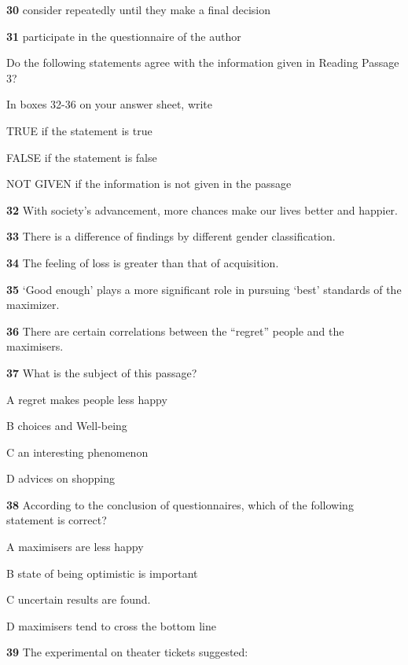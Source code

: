 \documentclass{../templateReading/cdreading}
\begin{document}
\textbf{30} consider repeatedly until they make a final decision

\textbf{31} participate in the questionnaire of the author


Do the following statements agree with the information given in Reading Passage 3?

In boxes 32-36 on your answer sheet, write

TRUE               if the statement is true

FALSE              if the statement is false

NOT GIVEN    if the information is not given in the passage

\textbf{32} With society’s advancement, more chances make our lives better and happier.

\textbf{33} There is a difference of findings by different gender classification.

\textbf{34} The feeling of loss is greater than that of acquisition.

\textbf{35} ‘Good enough’ plays a more significant role in pursuing ‘best’ standards of the maximizer.

\textbf{36} There are certain correlations between the “regret” people and the maximisers.




\textbf{37} What is the subject of this passage?

A   regret makes people less happy

B   choices and Well-being

C   an interesting phenomenon

D   advices on shopping

\textbf{38} According to the conclusion of questionnaires, which of the following statement is correct?

A   maximisers are less happy

B   state of being optimistic is important

C   uncertain results are found.

D   maximisers tend to cross the bottom line

\textbf{39} The experimental on theater tickets suggested:
\end{document}

